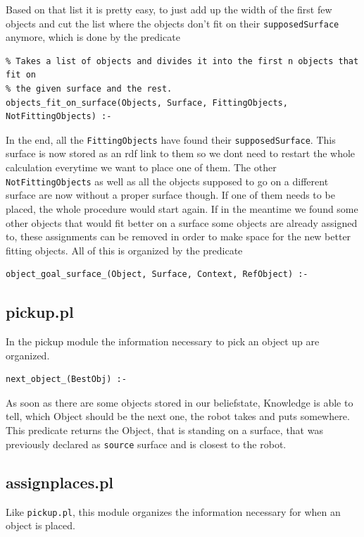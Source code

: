 \documentclass[main.tex]{subfiles}
\begin{document}
Based on that list it is pretty easy, to just add up the width of the first few objects and cut the list where the objects don't fit on their \texttt{supposedSurface} anymore, which is done by the predicate
\begin{lstlisting}
% Takes a list of objects and divides it into the first n objects that fit on
% the given surface and the rest.
objects_fit_on_surface(Objects, Surface, FittingObjects, NotFittingObjects) :-
\end{lstlisting}

In the end, all the \texttt{FittingObjects} have found their \texttt{supposedSurface}. This surface is now stored as an rdf link to them so we dont need to restart the whole calculation everytime we want to place one of them. The other \texttt{NotFittingObjects} as well as all the objects supposed to go on a different surface are now without a proper surface though. If one of them needs to be placed, the whole procedure would start again. If in the meantime we found some other objects that would fit better on a surface some objects are already assigned to, these assignments can be removed in order to make space for the new better fitting objects. All of this is organized by the predicate 
\begin{lstlisting}
object_goal_surface_(Object, Surface, Context, RefObject) :-
\end{lstlisting}

\subsection{pickup.pl}\label{sec:kn_pickup}

In the pickup module the information necessary to pick an object up are organized.

\begin{lstlisting}
next_object_(BestObj) :-
\end{lstlisting}
As soon as there are some objects stored in our beliefstate, Knowledge is able to tell, which Object should be the next one, the robot takes and puts somewhere. This predicate returns the Object, that is standing on a surface, that was previously declared as \texttt{source} surface and is closest to the robot.

\subsection{assignplaces.pl}

Like \texttt{pickup.pl}, this module organizes the information necessary for when an object is placed.\\
\end{document}

